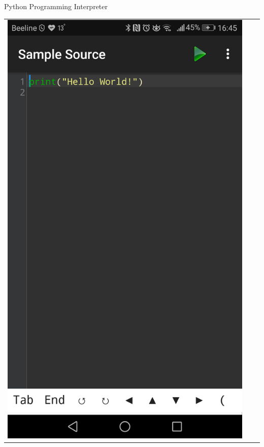\documentclass[12pt]{beamer}
\begin{document}
\begin{frame}{Python Programming Interpreter}
\begin{center}
\begin{tabular}{ccc}
		\includegraphics[scale=0.083]{image/interpreter_02.PNG} & 

\end{tabular}
\end{center}
\end{frame}
\end{document}
